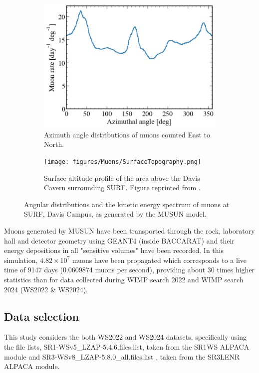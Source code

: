 \begin{figure}[htbp]
\begin{subfigure}[b]{0.49\textwidth}
        \centering 
        \includegraphics[width=\textwidth]{figures/Muons/Azimuthal.pdf}
        \caption{Azimuth angle distributions of muons counted East to North.}
        \label{fig:Muons/azi}
    \end{subfigure}
    \begin{subfigure}[b]{0.49\textwidth}   
        \centering 
        \texttt{[image: figures/Muons/SurfaceTopography.png]}
        \caption{Surface altitude profile of the area above the Davis Cavern surrounding SURF. Figure reprinted from \cite{dwoodward:thesis}.} 
        \label{Azi_vs_Zen}
    \end{subfigure}
    \caption{Angular distributions and the kinetic energy spectrum of muons at SURF, Davis Campus, as generated by the MUSUN model.} 
    \label{Prime_info}
\end{figure}
\par Muons generated by MUSUN have been transported through the rock, laboratory hall and detector geometry using GEANT4 (inside BACCARAT) and their energy depositions in all "sensitive volumes" have been recorded. In this simulation, $4.82\times10^7$ muons have been propagated which corresponds to a live time of 9147 days (0.0609874 muons per second), providing about 30 times higher statistics than for data collected during WIMP search 2022 and WIMP search 2024 (WS2022 \& WS2024).

\subsection{Data selection}\label{sec:Muons/MuonFluxDataSelection}
This study considers the both WS2022 and WS2024 datasets, specifically using the file lists, {\selectfont SR1-WSv5\_LZAP-5.4.6.files.list}, taken from the {\selectfont SR1WS} ALPACA module and {\selectfont SR3-WSv8\_LZAP-5.8.0\_all.files.list }, taken from the {\selectfont SR3LENR} ALPACA module. 

